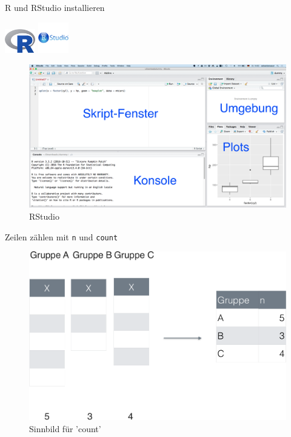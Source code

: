 \begin{frame}{R und RStudio installieren}

\includegraphics[width=0.10000\textwidth]{../images/Rahmen/Rlogo.png}
\includegraphics[width=0.10000\textwidth]{../images/Rahmen/rstudiologo.png}

\begin{figure}

{\centering \includegraphics[width=0.5\linewidth]{../images/Rahmen/RStudio-Screenshot} 

}

\caption{RStudio}\label{fig:unnamed-chunk-2}
\end{figure}

\end{frame}

\begin{frame}{Zeilen zählen mit \texttt{n} und \texttt{count}}

\begin{figure}

{\centering \includegraphics[width=0.8\linewidth]{../images/Datenjudo/count-crop} 

}

\caption{Sinnbild für 'count'}\label{fig:fig-count}
\end{figure}

\end{frame}

